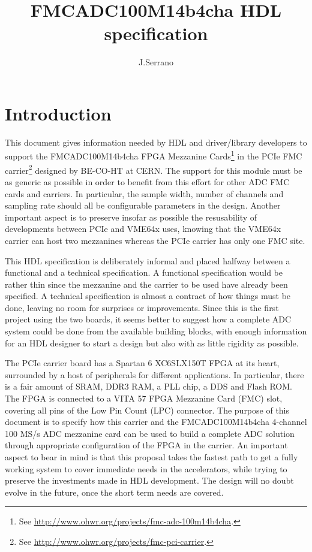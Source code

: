 \documentclass{article}
\title{FMCADC100M14b4cha HDL specification}
\author{J.Serrano}
\begin{document}
\maketitle


\section{Introduction}
This document gives information needed by HDL and driver/library developers to support the FMCADC100M14b4cha FPGA Mezzanine Cards\footnote{See \href{http://www.ohwr.org/projects/fmc-adc-100m14b4cha}{http://www.ohwr.org/projects/fmc-adc-100m14b4cha}.} in the PCIe FMC carrier\footnote{See \href{http://www.ohwr.org/projects/fmc-pci-carrier}{http://www.ohwr.org/projects/fmc-pci-carrier}.} designed by BE-CO-HT at CERN. The support for this module must be as generic as possible in order to benefit from this effort for other ADC FMC cards and carriers. In particular, the sample width, number of channels and sampling rate should all be configurable parameters in the design. Another important aspect is to preserve insofar as possible the resusability of developments between PCIe and VME64x uses, knowing that the VME64x carrier can host two mezzanines whereas the PCIe carrier has only one FMC site.

This HDL specification is deliberately informal and placed halfway between a functional and a technical specification. A functional specification would be rather thin since the mezzanine and the carrier to be used have already been specified. A technical specification is almost a contract of how things must be done, leaving no room for surprises or improvements. Since this is the first project using the two boards, it seems better to suggest how a complete ADC system could be done from the available building blocks, with enough information for an HDL designer to start a design but also with as little rigidity as possible.

The PCIe carrier board has a Spartan 6 XC6SLX150T FPGA at its heart, surrounded by a host of peripherals for different applications. In particular, there is a fair amount of SRAM, DDR3 RAM, a PLL chip, a DDS and Flash ROM. The FPGA is connected to a VITA 57 FPGA Mezzanine Card (FMC) slot, covering all pins of the Low Pin Count (LPC) connector. The purpose of this document is to specify how this carrier and the FMCADC100M14b4cha 4-channel 100 MS/s ADC mezzanine card can be used to build a complete ADC solution through appropriate configuration of the FPGA in the carrier. An important aspect to bear in mind is that this proposal takes the fastest path to get a fully working system to cover immediate needs in the accelerators, while trying to preserve the investments made in HDL development. The design will no doubt evolve in the future, once the short term needs are covered.
\end{document}
